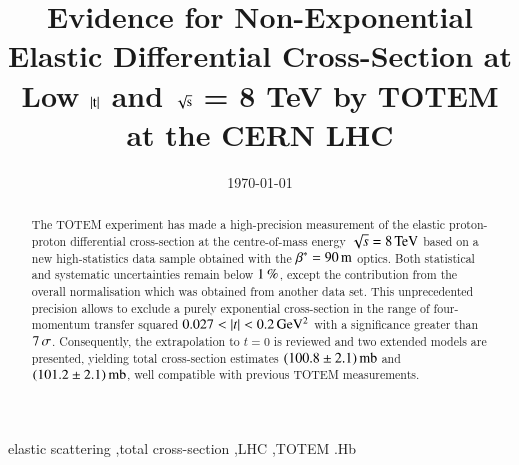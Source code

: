 \documentclass[3p,twocolumn]{elsarticle}
\def\un#1{\,{\rm #1}}
\begin{document}
\begin{frontmatter}

\title{Evidence for Non-Exponential Elastic Differential Cross-Section at Low $|\hbox{t}|$ and $\sqrt{\hbox{s}}$ = 8 TeV by TOTEM at the CERN LHC}



\date{\today}


\begin{abstract}
The TOTEM experiment has made a high-precision measurement of the elastic 
proton-proton differential cross-section at the centre-of-mass energy 
$\sqrt s = 8\un{TeV}$ based on a new high-statistics data sample obtained with 
the $\beta^* = 90\un{m}$ optics. 
Both statistical and systematic uncertainties remain below $1\un{\%}$, except 
the contribution from the overall normalisation which was obtained from 
another data set. This unprecedented precision allows to exclude a purely exponential cross-section in the range of four-momentum transfer squared $0.027 < |t| < 0.2\un{GeV^2}$ with a significance greater than $7\un{\sigma}$. Consequently, the extrapolation to $t=0$ is reviewed and two extended models are presented, yielding total cross-section estimates $(100.8 \pm 2.1)\un{mb}$ and $(101.2 \pm 2.1)\un{mb}$, well compatible with previous TOTEM measurements.
%
\end{abstract}

\begin{keyword}
elastic scattering \sep total cross-section \sep LHC \sep TOTEM
.Hb %
\end{keyword}
\end{frontmatter}



\end{document}
